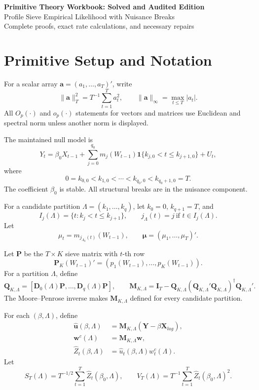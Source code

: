 \documentclass[12pt]{article}
\numberwithin{equation}{section}
\theoremstyle{definition}
\newcommand{\ind}{\mathbf 1}
\begin{document}
\begin{center}
{\Large\bf Primitive Theory Workbook: Solved and Audited Edition}\\[6pt]
{\large Profile Sieve Empirical Likelihood with Nuisance Breaks}\\[6pt]
{\normalsize Complete proofs, exact rate calculations, and necessary repairs}
\end{center}

\tableofcontents
\newpage

\section{Primitive Setup and Notation}

For a scalar array \(\bm a=(a_1,\ldots,a_T)'\), write
\[
    \|\bm a\|_T^2=T^{-1}\sum_{t=1}^T a_t^2,
    \qquad
    \|\bm a\|_\infty=\max_{t\leq T}|a_t|.
\]
All \(O_p(\cdot)\) and \(o_p(\cdot)\) statements for vectors and matrices use Euclidean and spectral norm unless another norm is displayed.

The maintained null model is
\begin{equation}
    Y_t
    =
    \beta_0X_{t-1}
    +
    \sum_{j=0}^{q_0}
    m_j(W_{t-1})\ind\{k_{j,0}<t\leq k_{j+1,0}\}
    +
    U_t,
    \label{eq:primitive-model}
\end{equation}
where
\[
    0=k_{0,0}<k_{1,0}<\cdots<k_{q_0,0}<k_{q_0+1,0}=T.
\]
The coefficient \(\beta_0\) is stable. All structural breaks are in the nuisance component.

For a candidate partition \(\Lambda=(k_1,\ldots,k_q)\), let \(k_0=0\), \(k_{q+1}=T\), and
\[
    I_j(\Lambda)=\{t:k_j<t\leq k_{j+1}\},
    \qquad
    j_\Lambda(t)=j\ \text{if }t\in I_j(\Lambda).
\]
Let
\[
    \mu_t=m_{j_{\Lambda_0}(t)}(W_{t-1}),
    \qquad
    \bm\mu=(\mu_1,\ldots,\mu_T)'.
\]

Let \(\bm P\) be the \(T\times K\) sieve matrix with \(t\)-th row
\[
    \bm P_K(W_{t-1})'=(p_1(W_{t-1}),\ldots,p_K(W_{t-1})).
\]
For a partition \(\Lambda\), define
\begin{equation}
    \bm Q_{K,\Lambda}
    =
    [\bm D_0(\Lambda)\bm P,\ldots,\bm D_q(\Lambda)\bm P],
    \qquad
    \bm M_{K,\Lambda}
    =
    \bm I_T-\bm Q_{K,\Lambda}
    (\bm Q_{K,\Lambda}'\bm Q_{K,\Lambda})^\dagger
    \bm Q_{K,\Lambda}'.
    \label{eq:primitive-qm}
\end{equation}
The Moore--Penrose inverse makes \(\bm M_{K,\Lambda}\) defined for every candidate partition.

For each \((\beta,\Lambda)\), define
\begin{align}
    \widehat{\bm u}(\beta,\Lambda)
    &=
    \bm M_{K,\Lambda}(\bm Y-\beta\bm X_{lag}),
    \\
    \bm w^c(\Lambda)
    &=
    \bm M_{K,\Lambda}\bm w,
    \\
    \widehat Z_t(\beta,\Lambda)
    &=
    \widehat u_t(\beta,\Lambda)w_t^c(\Lambda).
\end{align}
Let
\[
    S_T(\Lambda)
    =
    T^{-1/2}\sum_{t=1}^T\widehat Z_t(\beta_0,\Lambda),
    \qquad
    V_T(\Lambda)
    =
    T^{-1}\sum_{t=1}^T\widehat Z_t(\beta_0,\Lambda)^2.
\]
\end{document}
